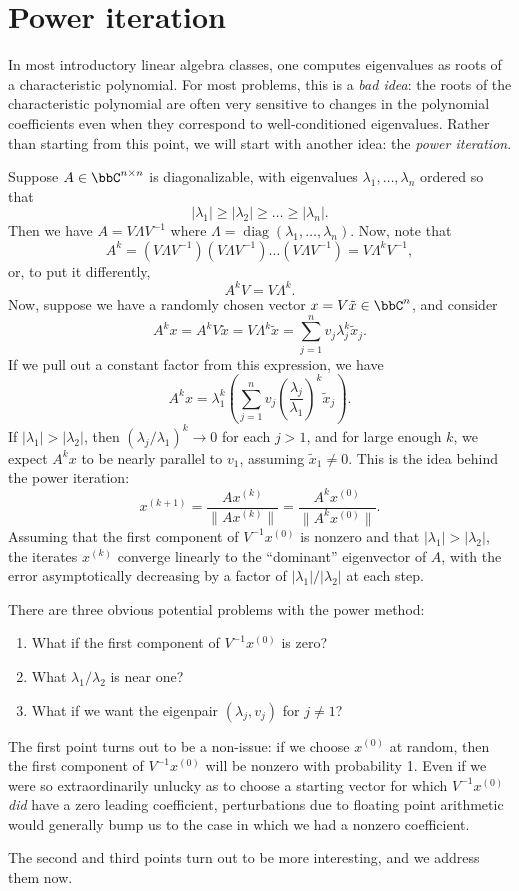 \section{Power iteration}

In most introductory linear algebra classes, one computes
eigenvalues as roots of a characteristic polynomial.
For most problems, this is a {\em bad idea}: the roots of
the characteristic polynomial are often very sensitive to changes
in the polynomial coefficients even when they correspond to
well-conditioned eigenvalues.  Rather than starting from this
point, we will start with another idea: the {\em power iteration}.

Suppose $A \in \bbC^{n \times n}$ is diagonalizable, with eigenvalues
$\lambda_1, \ldots, \lambda_n$ ordered so that
\[
  |\lambda_1| \geq
  |\lambda_2| \geq \ldots \geq
  |\lambda_n|.
\]
Then we have $A = V \Lambda V^{-1}$ where
$\Lambda = \operatorname{diag}(\lambda_1, \ldots, \lambda_n)$.  Now, note that
\[
  A^k = (V \Lambda V^{-1})(V \Lambda V^{-1}) \ldots (V\Lambda V^{-1})
      = V \Lambda^k V^{-1},
\]
or, to put it differently,
\[
  A^k V = V \Lambda^k.
\]
Now, suppose we have a randomly chosen vector $x = V \tilde{x} \in \bbC^{n}$,
and consider
\[
  A^k x = A^k V \tilde{x} = V \Lambda^k \tilde{x}
        = \sum_{j=1}^n v_j \lambda_j^k \tilde{x}_j.
\]
If we pull out a constant factor from this expression, we have
\[
  A^k x = \lambda_1^k \left(
    \sum_{j=1}^n v_j \left( \frac{\lambda_j}{\lambda_1} \right)^k \tilde{x}_j
  \right).
\]
If $|\lambda_1| > |\lambda_2|$, then
$(\lambda_j/\lambda_1)^k \rightarrow 0$ for each $j > 1$, and for
large enough $k$, we expect $A^k x$ to be nearly parallel to $v_1$,
assuming $\tilde{x}_1 \neq 0$.  This is the idea behind the power
iteration:
\[
  x^{(k+1)} = \frac{A x^{(k)}}{\|A x^{(k)}\|}
           = \frac{A^k x^{(0)}}{\|A^k x^{(0)}\|}.
\]
Assuming that the first component of $V^{-1} x^{(0)}$ is nonzero
and that $|\lambda_1| > |\lambda_2|$, the iterates $x^{(k)}$
converge linearly to the ``dominant'' eigenvector of $A$, with the
error asymptotically decreasing by a factor of $|\lambda_1|/|\lambda_2|$
at each step.

There are three obvious potential problems with the power method:
\begin{enumerate}
\item
  What if the first component of $V^{-1} x^{(0)}$ is zero?
\item
  What $\lambda_1/\lambda_2$ is near one?
\item
  What if we want the eigenpair $(\lambda_j, v_j)$ for $j \neq 1$?
\end{enumerate}
The first point turns out to be a non-issue: if we choose $x^{(0)}$ at
random, then the first component of $V^{-1} x^{(0)}$ will be nonzero
with probability 1.  Even if we were so extraordinarily unlucky as to
choose a starting vector for which $V^{-1} x^{(0)}$ {\em did} have a
zero leading coefficient, perturbations due to floating point
arithmetic would generally bump us to the case in which we had a
nonzero coefficient.

The second and third points turn out to be more interesting,
and we address them now.
